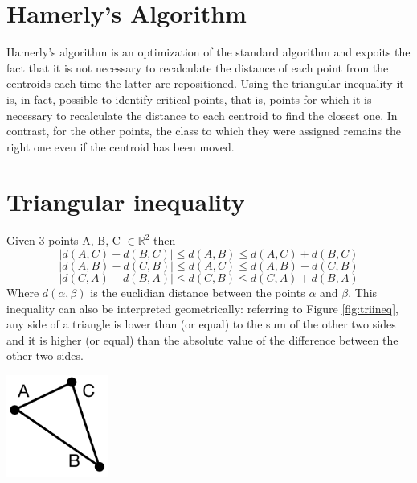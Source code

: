 \documentclass{report}
\begin{document}
\begin{minipage}[b]{0.48\textwidth}
  \section*{Hamerly's Algorithm}
  Hamerly's algorithm is an optimization of the standard algorithm and expoits the fact that it is not necessary to recalculate the distance of each point from the centroids each time the latter are repositioned. Using the triangular inequality it is, in fact, possible to identify critical points, that is, points for which it is necessary to recalculate the distance to each centroid to find the closest one. In contrast, for the other points, the class to which they were assigned remains the right one even if the centroid has been moved.

  \section*{Triangular inequality}
  Given 3 points A, B, C $\in \mathbb{R}^2$ then  
  \begin{equation}
    |d(A, C) - d(B, C)| \leq d(A, B) \leq d(A, C) + d(B, C)
  \end{equation}
  \begin{equation}
    |d(A, B) - d(C, B)| \leq d(A, C) \leq d(A, B) + d(C, B)
  \end{equation}
  \begin{equation}
    |d(C, A) - d(B, A)| \leq d(C, B) \leq d(C, A) + d(B, A)
  \end{equation}
  Where $d(\alpha, \beta)$ is the euclidian distance between the points $\alpha$ and $\beta$. This inequality can also be interpreted geometrically: referring to Figure \ref{fig:triineq}, any side of a triangle is lower than (or equal) to the sum of the other two sides and it is higher (or equal) than the absolute value of the difference between the other two sides.

  \hspace{0.1in}
  \begin{center}
    \includegraphics[width = 0.25\textwidth]{imgs/triangle.png}
    \label{fig:triineq}
  \end{center}


\end{minipage}
\end{document}
